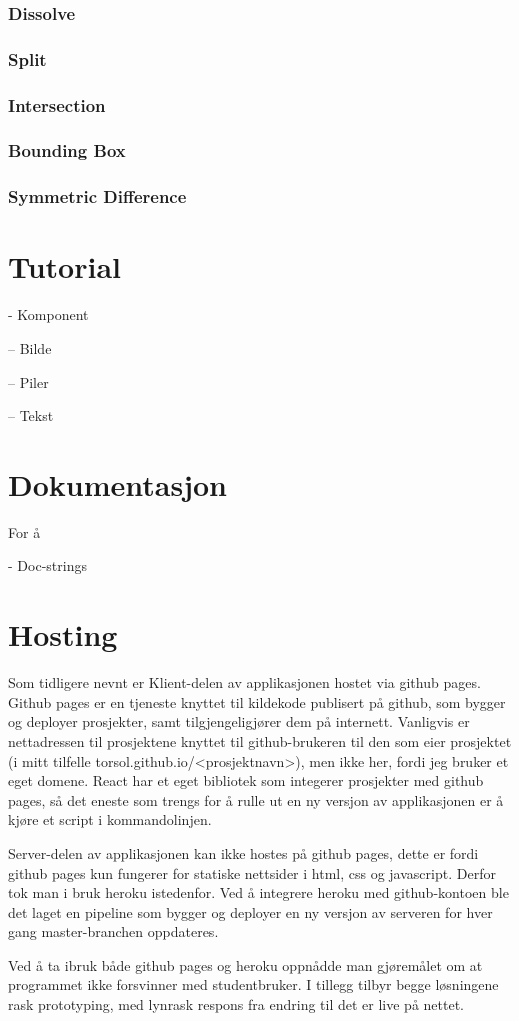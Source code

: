 \subsubsection{Dissolve}
\subsubsection{Split}
\subsubsection{Intersection}
\subsubsection{Bounding Box}
\subsubsection{Symmetric Difference}

\section{Tutorial}

- Komponent

-- Bilde

-- Piler

-- Tekst

\section{Dokumentasjon}

For å 

- Doc-strings

\section{Hosting}
\label{sec:hosting}
Som tidligere nevnt er Klient-delen av applikasjonen hostet via github pages. Github pages er en tjeneste knyttet til kildekode publisert på github, som bygger og deployer prosjekter, samt tilgjengeligjører dem på internett. Vanligvis er nettadressen til prosjektene knyttet til github-brukeren til den som eier prosjektet (i mitt tilfelle torsol.github.io/<prosjektnavn>), men ikke her, fordi jeg bruker et eget domene. React har et eget bibliotek som integerer prosjekter med github pages, så det eneste som trengs for å rulle ut en ny versjon av applikasjonen er å kjøre et script i kommandolinjen. 

Server-delen av applikasjonen kan ikke hostes på github pages, dette er fordi github pages kun fungerer for statiske nettsider i html, css og javascript. Derfor tok man i bruk heroku istedenfor. Ved å integrere heroku med github-kontoen ble det laget en pipeline som bygger og deployer en ny versjon av serveren for hver gang master-branchen oppdateres. 

Ved å ta ibruk både github pages og heroku oppnådde man gjøremålet om at programmet ikke forsvinner med studentbruker. I tillegg tilbyr begge løsningene rask prototyping, med lynrask respons fra endring til det er live på nettet. 

